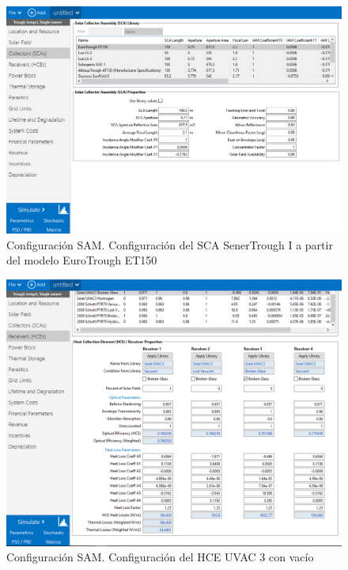 \documentclass[11pt]{article}
\begin{document}
\begin{figure}
\includegraphics[scale=0.8]{images/captura_sam02.png}
\caption{Configuración SAM. Configuración del SCA SenerTrough I a partir del modelo EuroTrough ET150} 
\label{fig:captura02}
\end{figure}

\begin{figure}
\includegraphics[scale=0.8]{images/captura_sam03.png}
\caption{Configuración SAM. Configuración del HCE UVAC 3 con vacío}
\label{fig:captura03}
\end{figure}
\end{document}
